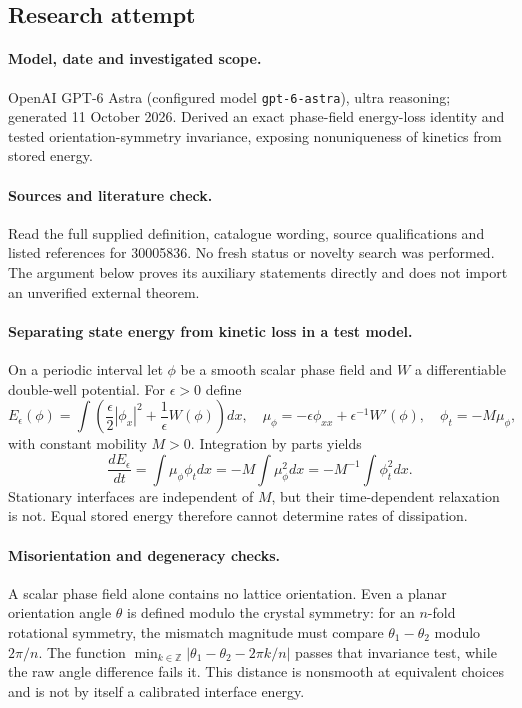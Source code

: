 \documentclass[11pt]{article}
\begin{document}
\subsection{Research attempt}
\paragraph{Model, date and investigated scope.}
OpenAI GPT-6 Astra (configured model \texttt{gpt-6-astra}), ultra reasoning; generated 11 October 2026. Derived an exact phase-field energy-loss identity and tested orientation-symmetry invariance, exposing nonuniqueness of kinetics from stored energy.

\paragraph{Sources and literature check.}
Read the full supplied definition, catalogue wording, source qualifications and listed references for 30005836. No fresh status or novelty search was performed. The argument below proves its auxiliary statements directly and does not import an unverified external theorem.

\paragraph{Separating state energy from kinetic loss in a test model.} On a periodic interval let \(\phi\) be a smooth scalar phase field and \(W\) a differentiable double-well potential. For \(\epsilon>0\) define
\[
 E_\epsilon(\phi)=\int\left(\frac\epsilon2|\phi_x|^2+\frac1\epsilon W(\phi)\right)dx,
 \quad \mu_\phi=-\epsilon\phi_{xx}+\epsilon^{-1}W'(\phi),
 \quad \phi_t=-M\mu_\phi,
\]
with constant mobility \(M>0\). Integration by parts yields
\[
 \frac{dE_\epsilon}{dt}=\int\mu_\phi\phi_tdx
 =-M\int\mu_\phi^2dx=-M^{-1}\int\phi_t^2dx.
\]
Stationary interfaces are independent of \(M\), but their time-dependent relaxation is not. Equal stored energy therefore cannot determine rates of dissipation.
\paragraph{Misorientation and degeneracy checks.} A scalar phase field alone contains no lattice orientation. Even a planar orientation angle \(\theta\) is defined modulo the crystal symmetry: for an \(n\)-fold rotational symmetry, the mismatch magnitude must compare \(\theta_1-\theta_2\) modulo \(2\pi/n\). The function \(\min_{k\in\mathbb Z}|\theta_1-\theta_2-2\pi k/n|\) passes that invariance test, while the raw angle difference fails it. This distance is nonsmooth at equivalent choices and is not by itself a calibrated interface energy.
\end{document}
